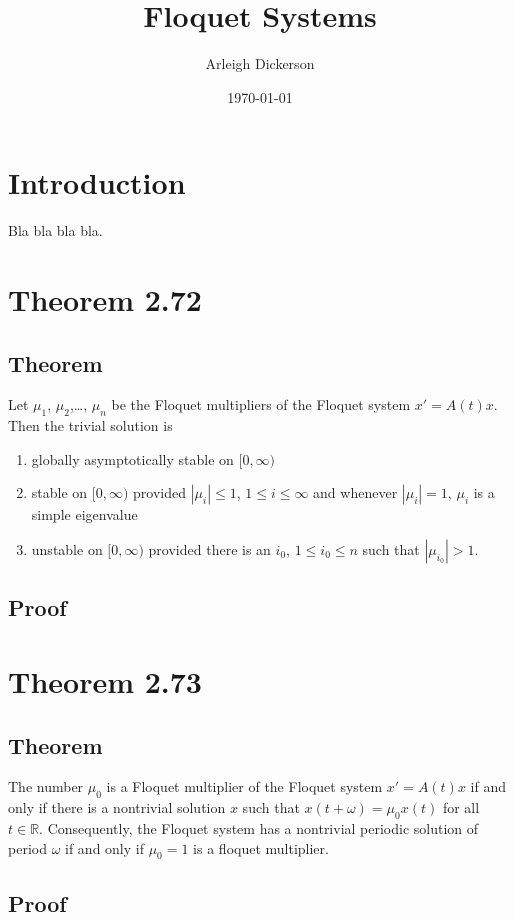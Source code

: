\documentclass[a4paper]{article}
\title{Floquet Systems}
\author{Arleigh Dickerson}
\date{\today}
\begin{document}
\maketitle

\section{Introduction}

Bla bla bla bla.

\section{Theorem 2.72}

\subsection{Theorem}

Let $\mu_1$, $\mu_2$,\ldots, $\mu_n$ be the Floquet multipliers of the Floquet system $x' = A(t)x$. Then the trivial solution is \begin{enumerate}
    \item globally asymptotically stable on $[0,\infty)$
    \item stable on $[0,\infty)$ provided $|\mu_i| \leq 1$, $1 \leq i \leq \infty$ and whenever $|\mu_i| = 1$, $\mu_i$ is a simple eigenvalue
    \item unstable on $[0,\infty)$ provided there is an $i_0$, $1 \leq i_0 \leq n$ such that $|\mu_{i_0}| > 1$.
\end{enumerate}

\subsection{Proof}

\section{Theorem 2.73}

\subsection{Theorem}

The number $\mu_0$ is a Floquet multiplier of the Floquet system $x' = A(t)x$ if and only if there is a nontrivial solution $x$ such that $x(t + \omega) = \mu_0 x(t)$ for all $t \in \mathbb{R}$. Consequently, the Floquet system has a nontrivial periodic solution of period $\omega$ if and only if $\mu_0 = 1$ is a floquet multiplier.

\subsection{Proof}
\end{document}
